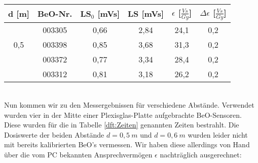 \minipanf
	\begin{center}	
		\begin{tabular}{c|c|c|c|c|c}
					\textbf{d} [m] & BeO-Nr. & \textbf{LS$_0$} [mVs] & \textbf{LS} [mVs] & \textbf{$\epsilon$} [$\frac{Vs}{Gy}$] & $\Delta \epsilon$ [$\frac{Vs}{Gy}$]  \\
			\hline  
								& 003305 & 0,66 & 2,84 & 24,1 & 0,2\\
						0,5		& 003398 & 0,85 & 3,68 & 31,3 & 0,2\\
								& 003372 & 0,77 & 3,34 & 28,4 & 0,2\\
								& 003312 & 0,81 & 3,18 & 26,2 & 0,2\\								
		\end{tabular}
	\end{center}
\minipend
\vspace{3mm}

\ \\
Nun kommen wir zu den Messergebnissen für verschiedene Abstände. Verwendet wurden vier in der Mitte einer Plexisglas-Platte aufgebrachte BeO-Sensoren. Diese wurden für die in Tabelle \ref{dft:Zeiten} genannten Zeiten bestrahlt. 
Die Dosiswerte der beiden Abstände $d = 0,5\ \unit{m}$ und $d = 0,6\ \unit{m}$ wurden leider nicht mit bereits kalibrierten BeO's vermessen. Wir haben diese allerdings von Hand über die vom PC bekannten Ansprechvermögen $\epsilon$ nachträglich ausgerechnet:
 
